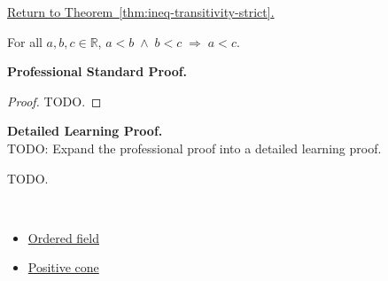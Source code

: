 \newpage
{}
\label{prf:ineq-transitivity-strict}

\begin{remark*}[Return]
\hyperref[thm:ineq-transitivity-strict]{Return to Theorem~\ref*{thm:ineq-transitivity-strict}.}
\end{remark*}

\begin{theorem*}
For all $a, b, c \in \mathbb{R}$,
$a < b \;\land\; b < c \;\Rightarrow\; a < c$.
\end{theorem*}

\textbf{Professional Standard Proof.}~\\
\begin{proof}
TODO.
\end{proof}

\textbf{Detailed Learning Proof.}~\\
TODO: Expand the professional proof into a detailed learning proof.


\begin{remark*}
TODO.
\end{remark*}

\begin{remark*}[Dependencies]~\\
\begin{itemize}
  \item \hyperref[def:ordered-field]{Ordered field}
  \item \hyperref[def:positive-cone]{Positive cone}
\end{itemize}
\end{remark*}
